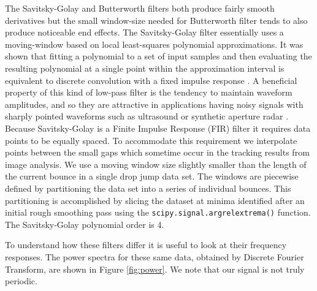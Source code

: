 \documentclass[12pt,a4paper,oneside]{book}
\begin{document}
The Savitsky-Golay and Butterworth filters both produce fairly smooth derivatives but the small window-size needed for Butterworth filter tends to also produce noticeable end effects. The Savitsky-Golay filter essentially uses a moving-window based on local least-squares polynomial approximations. It was shown that fitting a polynomial to a set of input samples and then evaluating the resulting polynomial at a single point within the approximation interval is equivalent to discrete convolution with a fixed impulse response \cite{savitzky_smoothing_1964}. A beneficial property of this kind of low-pass filter is the tendency to maintain waveform amplitudes, and so they are attractive in applications having noisy signals with sharply pointed waveforms such as ultrasound or synthetic aperture radar \cite{schafer_what_2011}. Because Savitsky-Golay is a Finite Impulse Response (FIR) filter it requires data points to be equally spaced. To accommodate this requirement we interpolate points between the small gaps which sometime occur in the tracking results from image analysis. We use a moving window size slightly smaller than the length of the current bounce in a single drop jump data set. The windows are piecewise defined by partitioning the data set into a series of individual bounces. This partitioning is accomplished by slicing the dataset at minima identified after an initial rough smoothing pass using the \verb|scipy.signal.argrelextrema()| function. The Savitsky-Golay polynomial order is 4. 

To understand how these filters differ it is useful to look at their frequency responses. The power spectra for these same data, obtained by Discrete Fourier Transform, are shown in Figure \ref{fig:power}. We note that our signal is not truly periodic. 
\end{document}
